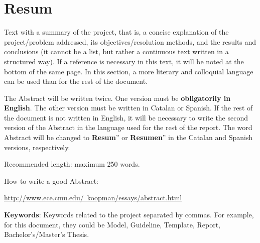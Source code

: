 \chapter*{Resum}

Text with a summary of the project, that is, a concise explanation of the project/problem addressed, its objectives/resolution methods, and the results and conclusions (it cannot be a list, but rather a continuous text written in a structured way). If a reference is necessary in this text, it will be noted at the bottom of the same page. In this section, a more literary and colloquial language can be used than for the rest of the document.

The Abstract will be written twice. One version must be \textbf{obligatorily in English}. The other version must be written in Catalan or Spanish. If the rest of the document is not written in English, it will be necessary to write the second version of the Abstract in the language used for the rest of the report. The word Abstract will be changed to \textbf{Resum}'' or \textbf{Resumen}'' in the Catalan and Spanish versions, respectively.

Recommended length: maximum 250 words.

How to write a good Abstract:

\href{http://www.ece.cmu.edu/~koopman/essays/abstract.html}{http://www.ece.cmu.edu/~koopman/essays/abstract.html}

\vspace{1.5cm}

\textbf{Keywords}: Keywords related to the project separated by commas. For example, for this document, they could be Model, Guideline, Template, Report, Bachelor's/Master's Thesis.
